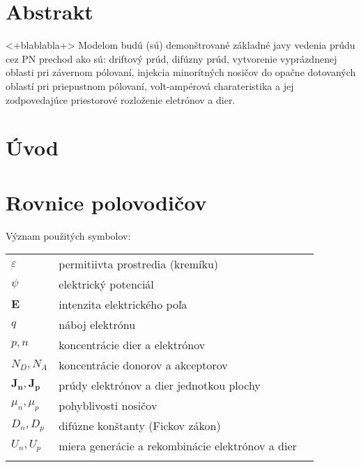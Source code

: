 \documentclass[a4paper, twoside, 12pt, onecolumn]{article}
\newcommand{\myfig}[3]
{
    \begin{figure}[!ht]
	\centering
	\texttt{[image: \#1]}
	\caption{#2}
	#3
    \end{figure}
}
\begin{document}

%




%

%

%







\section*{Abstrakt}
<+blablabla+>
Modelom budú (sú) demonštrované základné javy vedenia prúdu cez PN prechod ako sú: driftový prúd, difúzny prúd, vytvorenie vyprázdnenej oblasti pri závernom pólovaní, injekcia minorítných nosičov do opačne dotovaných oblastí pri priepustnom pólovaní, volt-ampérová charateristika a jej zodpovedajúce priestorové rozloženie eletrónov a dier.

\section{Úvod}


\section{Rovnice polovodičov}
Význam použitých symbolov:\\
\begin{tabular}{l l l}
	\hline
	$\varepsilon$ & permitiivta prostredia (kremíku)\\
	$\psi$ & elektrický potenciál \\
	$\mathbf{E}$ & intenzita elektrického poľa\\
	$q$ & náboj elektrónu\\
	$p, n$ & koncentrácie dier a elektrónov\\
	$N_D, N_A$ & koncentrácie donorov a akceptorov\footnotemark\\
	$\mathbf{J_n}, \mathbf{J_p}$ & prúdy elektrónov a dier jednotkou plochy\\
	$\mu_n, \mu_p$ & pohyblivosti nosičov\\
	$D_n, D_p$ & difúzne konštanty (Fickov zákon)\\
	$U_n, U_p$ & miera generácie a rekombinácie elektrónov a dier\\
	\hline \\
\end{tabular}
\end{document}

